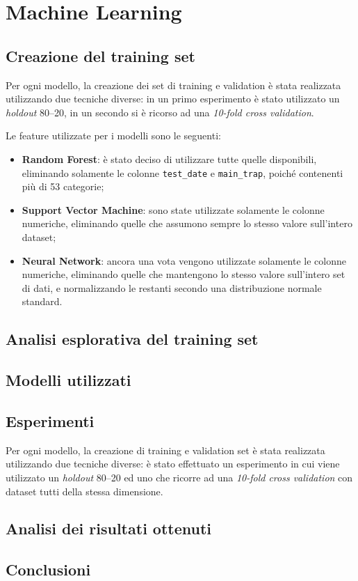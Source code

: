 \setcounter{chapter}{0}
\part{Machine Learning}
\chapter{Creazione del training set}
Per ogni modello, la creazione dei set di training e validation è stata 
realizzata utilizzando due tecniche diverse: in un primo esperimento è stato 
utilizzato un \textit{holdout} 80--20, in un secondo si è ricorso ad una 
\textit{10-fold cross validation}.

Le feature utilizzate per i modelli sono le seguenti:
\begin{itemize}
	\item \textbf{Random Forest}: è stato deciso di utilizzare tutte quelle 
	disponibili, eliminando solamente le colonne \texttt{test\_date} e 
	\texttt{main\_trap}, poiché contenenti più di 53 categorie;
	\item \textbf{Support Vector Machine}: sono state utilizzate solamente le 
	colonne numeriche, eliminando quelle che assumono sempre lo stesso 
	valore sull'intero dataset;
	\item \textbf{Neural Network}: ancora una vota vengono utilizzate solamente 
	le colonne numeriche, eliminando quelle che mantengono lo stesso valore 
	sull'intero set di dati, e	normalizzando le restanti secondo una 
	distribuzione normale standard.
\end{itemize} 

\chapter{Analisi esplorativa del training set}

\chapter{Modelli utilizzati}


\chapter{Esperimenti}
Per ogni modello, la creazione di training e validation set è stata realizzata 
utilizzando due tecniche diverse: è stato effettuato un esperimento in cui 
viene utilizzato un \textit{holdout} 80--20 ed uno che ricorre ad una 
\textit{10-fold cross validation} con dataset tutti della stessa dimensione.


\chapter{Analisi dei risultati ottenuti}

\chapter{Conclusioni}
